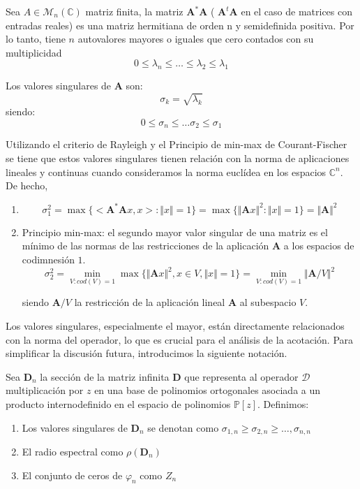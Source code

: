 \begin{definition}\label{def:singular_values}
  Sea $A \in \mathcal{M}_{n}(\mathbb{C})$ matriz finita, la matriz $\mathbf{A}^{*}\mathbf{A}$  ( $\mathbf{A}^{t}\mathbf{A}$ en el caso de matrices con entradas reales) es una matriz hermitiana de orden n y semidefinida positiva. Por lo tanto, tiene $n$ autovalores mayores o iguales que cero contados con su multiplicidad
  $$
    0 \leq \lambda_{n}\leq \dots \leq \lambda_{2} \leq \lambda_{1}
  $$


  \noindent Los valores singulares de $\mathbf{A}$ son:
  $$
    \sigma_{k}= \sqrt{\lambda_{k}}
  $$
  \noindent siendo:
  $$
    0 \leq \sigma_{n} \leq \dots \sigma_{2} \leq \sigma_{1}
  $$

  \noindent Utilizando el criterio de Rayleigh y el Principio de min-max de  Courant-Fischer \cite{gallier2017spectral} se tiene que estos valores singulares tienen relación con la norma de aplicaciones lineales y continuas cuando consideramos la norma euclídea en los espacios $\mathbb{C}^n$. De hecho,
  \begin{enumerate}
    \item $$
            \sigma_{1}^2 =
            \max \{ <\mathbf{A}^{*	}\mathbf{A}x,x>: \Vert x \Vert =1 \}
            = \max \{\Vert \mathbf{A} x \Vert^2 : \Vert x \Vert =1\}=
            \Vert \mathbf{A} \Vert^2
          $$
    \item Principio min-max: el segundo mayor valor singular de una matriz es el mínimo de las normas de las restricciones de la aplicación $\mathbf{A}$ a los espacios de codimnesión $1$.
          $$
            \sigma_{2}^2 = \min_{V: cod(V)=1} \max \{\Vert \mathbf{A}x \Vert^2 , x\in V, \Vert x \Vert =1\}= \min_{V: cod(V)=1} \Vert \mathbf{A}/V \Vert^2
          $$

          \noindent siendo $\mathbf{A}/V$ la restricción de la aplicación lineal $\mathbf{A}$ al subespacio $V$.

  \end{enumerate}
\end{definition}

Los valores singulares, especialmente el mayor, están directamente relacionados con la norma del operador, lo que es crucial para el análisis de la acotación. Para simplificar la discusión futura, introducimos la siguiente notación.

\begin{definition}\label{def:notation_matrix_sections}
  Sea $\mathbf{D}_{n}$ la sección de la matriz infinita $\mathbf{D}$ que representa al operador $\mathcal{D}$ multiplicación por $z$ en una base de polinomios ortogonales asociada a un producto internodefinido en el espacio de polinomios $\mathbb{P}[z]$. Definimos:
  \begin{enumerate}
    \item Los valores singulares de $\mathbf{D}_{n}$ se denotan como $\sigma_{1,n} \ge \sigma_{2,n} \ge \ldots, \sigma_{n,n}$
    \item El radio espectral como $\rho(\mathbf{D}_{n})$
    \item El conjunto de ceros de $\varphi_n$ como $Z_{n}$
  \end{enumerate}
\end{definition}

